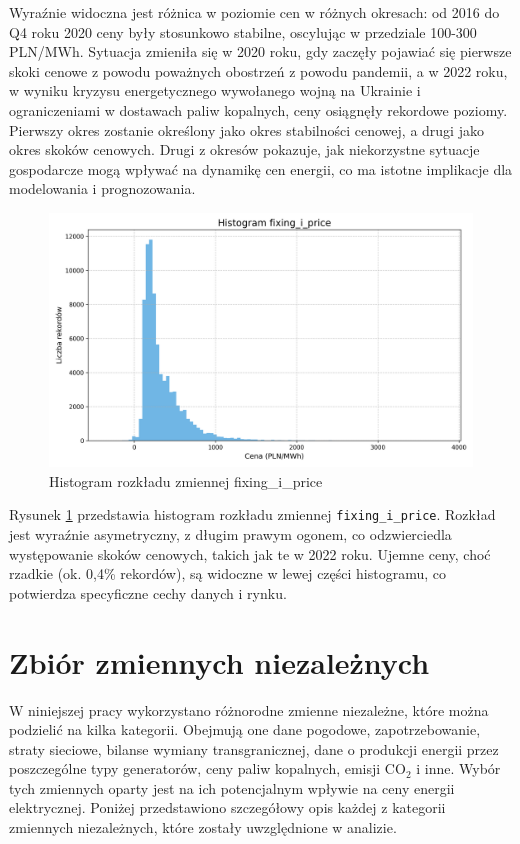 Wyraźnie widoczna jest różnica w poziomie cen w różnych okresach: od 2016 do Q4 roku 2020 ceny były stosunkowo stabilne, oscylując w przedziale 100-300 PLN/MWh. Sytuacja zmieniła się w 2020 roku, gdy zaczęły pojawiać się pierwsze skoki cenowe z powodu poważnych obostrzeń z powodu pandemii, a w 2022 roku, w wyniku kryzysu energetycznego wywołanego wojną na Ukrainie i ograniczeniami w dostawach paliw kopalnych, ceny osiągnęły rekordowe poziomy. Pierwszy okres zostanie określony jako okres stabilności cenowej, a drugi jako okres skoków cenowych. Drugi z okresów pokazuje, jak niekorzystne sytuacje gospodarcze mogą wpływać na dynamikę cen energii, co ma istotne implikacje dla modelowania i prognozowania.

\begin{figure}
    \centering
    \includegraphics[width=\textwidth]{../plots/fixing_i_price_histogram.png}
    \caption{Histogram rozkładu zmiennej fixing\_i\_price}
    \label{fig:fixing-i-price-histogram}
\end{figure}

Rysunek \ref{fig:fixing-i-price-histogram} przedstawia histogram rozkładu zmiennej \texttt{fixing\_i\_price}. Rozkład jest wyraźnie asymetryczny, z długim prawym ogonem, co odzwierciedla występowanie skoków cenowych, takich jak te w 2022 roku. Ujemne ceny, choć rzadkie (ok. 0,4\% rekordów), są widoczne w lewej części histogramu, co potwierdza specyficzne cechy danych i rynku.

\section{Zbiór zmiennych niezależnych}
W niniejszej pracy wykorzystano różnorodne zmienne niezależne, które można podzielić na kilka kategorii. Obejmują one dane pogodowe, zapotrzebowanie, straty sieciowe, bilanse wymiany transgranicznej, dane o produkcji energii przez poszczególne typy generatorów, ceny paliw kopalnych, emisji CO$_2$ i inne. Wybór tych zmiennych oparty jest na ich potencjalnym wpływie na ceny energii elektrycznej. Poniżej przedstawiono szczegółowy opis każdej z kategorii zmiennych niezależnych, które zostały uwzględnione w analizie.

